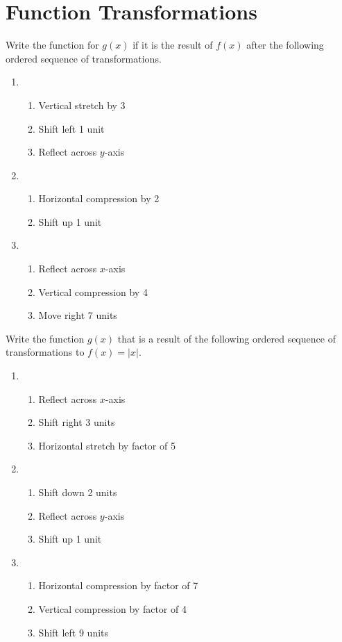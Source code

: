 \chapter{Function Transformations}

Write the function for $g(x)$ if it is the result of $f(x)$ after the following ordered sequence of transformations.
\begin{enumerate}
\item \begin{enumerate}[(1)]
	\item Vertical stretch by 3
	\item Shift left 1 unit
	\item Reflect across $y$-axis
\end{enumerate}
\item \begin{enumerate}[(1)]
	\item Horizontal compression by 2
	\item Shift up 1 unit
\end{enumerate}
\item \begin{enumerate}[(1)]
	\item Reflect across $x$-axis
	\item Vertical compression by 4
	\item Move right 7 units
\end{enumerate}
\setcounter{Review}{\value{enumi}}
\end{enumerate}

Write the function $g(x)$ that is a result of the following ordered sequence of transformations to $f(x)=|x|$.
\begin{enumerate}
\setcounter{enumi}{\value{Review}}
\item
\begin{enumerate}[(1)]
\item Reflect across $x$-axis
\item Shift right 3 units
\item Horizontal stretch by factor of 5
\end{enumerate}

\item
\begin{enumerate}[(1)]
\item Shift down 2 units
\item Reflect across $y$-axis
\item Shift up 1 unit
\end{enumerate}

\item
\begin{enumerate}[(1)]
\item Horizontal compression by factor of 7
\item Vertical compression by factor of 4
\item Shift left 9 units
\end{enumerate}
\setcounter{Review}{\value{enumi}}
\end{enumerate}

